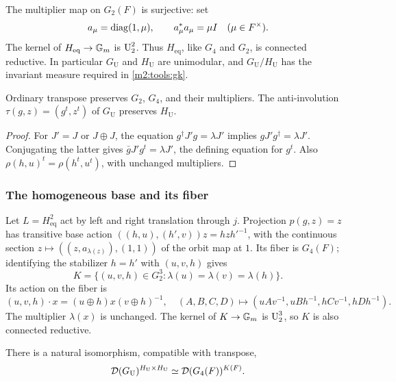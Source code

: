The multiplier map on $G_2(F)$ is surjective: set
\begin{equation}\label{m2:red:amul}
 a_\mu=\operatorname{diag}(1,\mu),\qquad a_\mu^*a_\mu=\mu I
 \quad(\mu\in F^\times).
\end{equation}
The kernel of $H_{\mathrm{eq}}\to\mathbb G_m$ is $\operatorname{U}_2^2$.
Thus $H_{\mathrm{eq}}$, like $G_4$ and $G_2$, is connected reductive.
In particular $G_{\mathrm U}$ and $H_{\mathrm U}$ are unimodular,
and $G_{\mathrm U}/H_{\mathrm U}$ has the invariant measure required
in \cref{m2:tools:gk}.

\begin{lemma}\label{m2:red:transpose}
Ordinary transpose preserves $G_2$, $G_4$, and their multipliers.
The anti-involution $\tau(g,z)=(g^t,z^t)$ of $G_{\mathrm U}$ preserves $H_{\mathrm U}$.
\end{lemma}

\begin{proof}
For $J'=J$ or $J\oplus J$, the equation
$g^\dagger J'g=\lambda J'$ implies $gJ'g^\dagger=\lambda J'$.
Conjugating the latter gives $\bar gJ'g^t=\lambda J'$, the defining
equation for $g^t$. Also $\rho(h,u)^t=\rho(h^t,u^t)$, with unchanged
multipliers.
\end{proof}

\subsubsection{The homogeneous base and its fiber}

Let $L=H_{\mathrm{eq}}^2$ act by left and right translation through $j$.
Projection $p(g,z)=z$ has transitive base action
$((h,u),(h',v))z=hzh'^{-1}$, with the continuous section
$z\mapsto((z,a_{\lambda(z)}),(1,1))$ of the orbit map at $1$.
Its fiber is $G_4(F)$; identifying the stabilizer $h=h'$ with
$(u,v,h)$ gives
\begin{equation}\label{m2:red:K}
 K=\{(u,v,h)\in G_2^3:
         \lambda(u)=\lambda(v)=\lambda(h)\}.
\end{equation}
Its action on the fiber is
\begin{equation}\label{m2:red:action}
 (u,v,h)\cdot x=(u\oplus h)x(v\oplus h)^{-1},
 \quad
 (A,B,C,D)\longmapsto
 (uAv^{-1},uBh^{-1},hCv^{-1},hDh^{-1}).
\end{equation}
The multiplier $\lambda(x)$ is unchanged. The kernel of
$K\to\mathbb G_m$ is $\operatorname{U}_2^3$, so $K$ is also connected reductive.

\begin{proposition}\label{m2:red:frobenius}
There is a natural isomorphism, compatible with transpose,
\begin{equation}\label{m2:red:distiso}
 \mathcal D(G_{\mathrm U})^{H_{\mathrm U}\times H_{\mathrm U}}
   \simeq\mathcal D(G_4(F))^{K(F)}.
\end{equation}
\end{proposition}


